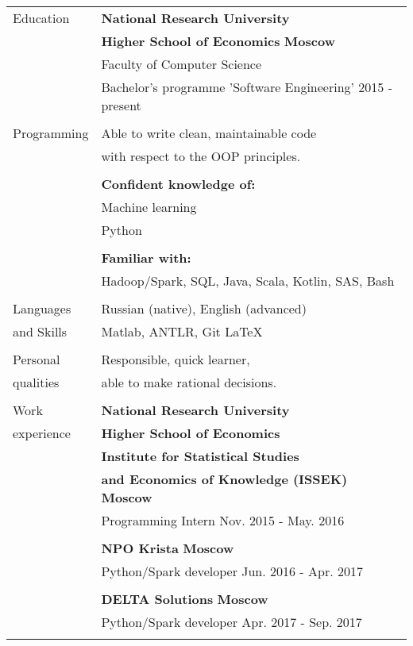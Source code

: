 \documentclass[a4paper,12pt]{article}
\begin{document}
\noindent \begin{tabular}{l l}
  \Large{Education}
     & \textbf{National Research University} \\
     & \textbf{Higher School of Economics} \hfill \hfill \textbf{Moscow} \\
     & Faculty of Computer Science \\
     & Bachelor’s programme 'Software Engineering' \hspace{0.8in} \hfill \hfill 2015 - present \\
     & \\
  \Large{Programming}
     & Able to write clean, maintainable code \\
     & with respect to the OOP principles. \\
     & \\
     & \textbf{Confident knowledge of:} \\
     & Machine learning   \\
     & Python  \\
     & \\
     & \textbf{Familiar with:} \\
     & Hadoop/Spark, SQL, Java, Scala, Kotlin, SAS, Bash \\
     & \\
  \Large{Languages} & Russian (native), English (advanced) \\
  \Large{and Skills} & Matlab, ANTLR, Git \LaTeX \\
     & \\
  \Large{Personal} & Responsible, quick learner, \\
  \Large{qualities} & able to make rational decisions. \\
     & \\
  \Large{Work}
     & \textbf{National Research University} \\
  \Large{experience}
     & \textbf{Higher School of Economics} \\
     & \textbf{Institute for Statistical Studies} \\
     & \textbf{and Economics of Knowledge (ISSEK)} \hfill \hfill \textbf{Moscow} \\
     & Programming Intern \hfill \hfill Nov. 2015 - May. 2016 \\
     & \\
     & \textbf{NPO Krista} \hfill \hfill \textbf{Moscow} \\
     & Python/Spark developer \hfill \hfill Jun. 2016 - Apr. 2017 \\
     & \\
     & \textbf{DELTA Solutions} \hfill \hfill \textbf{Moscow} \\
     & Python/Spark developer \hfill \hfill Apr. 2017 - Sep. 2017 \\
     & \\
     
\end{tabular}
\end{document}

